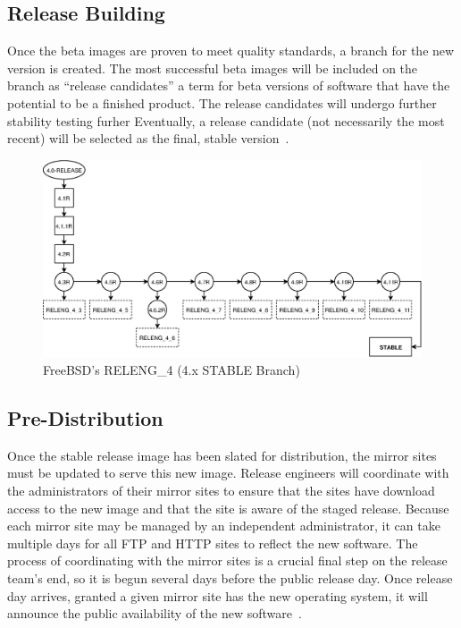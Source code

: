 \documentclass[conference]{IEEEtran}
\begin{document}
\subsection{Release Building}
Once the beta images are proven to meet quality standards,
a branch for the new version is created.
The most successful beta images will be included on the branch
as ``release candidates'' a term for beta versions of software
that have the potential to be a finished product.
The release candidates will undergo further stability testing furher
Eventually, a release candidate (not necessarily the most recent) will
be selected as the final, stable version~\cite{freebsdrelease}.

\begin{figure}[h!]
\includegraphics[width=\linewidth]{./images/FreeBSD_4.eps}
\caption{FreeBSD's RELENG\_4 (4.x STABLE Branch)}
\label{FreeBSD_4}
\end{figure}

\subsection{Pre-Distribution}
Once the stable release image has been slated for distribution,
the mirror sites must be updated to serve this new image.
Release engineers will coordinate with the administrators of their mirror
sites to ensure that the sites have download access to the new image and
that the site is aware of the staged release.
Because each mirror site may be managed by an independent administrator,
it can take multiple days for all FTP and HTTP sites
to reflect the new software.
The process of coordinating with the mirror sites is a crucial final step
on the release team's end, so it is begun several days before
the public release day.
Once release day arrives, granted a given mirror site has
the new operating system, it will announce the public availability
of the new software~\cite{freebsdftp}.
\end{document}
